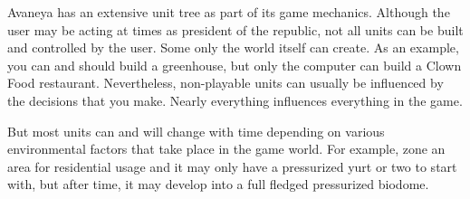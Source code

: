 

Avaneya has an extensive unit tree as part of its game mechanics. Although the user may be acting at times as president of the republic, not all units can be built and controlled by the user. Some only the world itself can create. As an example, you can and should build a greenhouse, but only the computer can build a Clown Food restaurant. Nevertheless, non-playable units can usually be influenced by the decisions that you make. Nearly everything influences everything in the game. 

But most units can and will change with time depending on various environmental factors that take place in the game world. For example, zone an area for residential usage and it may only have a pressurized yurt or two to start with, but after time, it may develop into a full fledged pressurized biodome.

